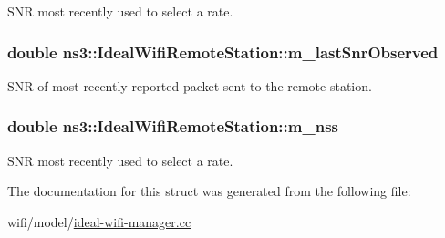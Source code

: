S\+NR most recently used to select a rate. 

\subsubsection[{\texorpdfstring{m\+\_\+last\+Snr\+Observed}{m_lastSnrObserved}}]{\setlength{\rightskip}{0pt plus 5cm}double ns3\+::\+Ideal\+Wifi\+Remote\+Station\+::m\+\_\+last\+Snr\+Observed}\hypertarget{structns3_1_1IdealWifiRemoteStation_a1e769a6ae77882fcbcf48944d9795a2e}{}\label{structns3_1_1IdealWifiRemoteStation_a1e769a6ae77882fcbcf48944d9795a2e}


S\+NR of most recently reported packet sent to the remote station. 

\subsubsection[{\texorpdfstring{m\+\_\+nss}{m_nss}}]{\setlength{\rightskip}{0pt plus 5cm}double ns3\+::\+Ideal\+Wifi\+Remote\+Station\+::m\+\_\+nss}\hypertarget{structns3_1_1IdealWifiRemoteStation_a98bccc591a044824986b623bc20c817c}{}\label{structns3_1_1IdealWifiRemoteStation_a98bccc591a044824986b623bc20c817c}


S\+NR most recently used to select a rate. 



The documentation for this struct was generated from the following file\+:\begin{DoxyCompactItemize}
\item 
wifi/model/\hyperlink{ideal-wifi-manager_8cc}{ideal-\/wifi-\/manager.\+cc}\end{DoxyCompactItemize}
